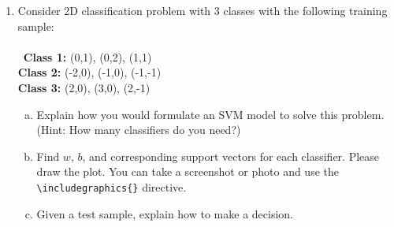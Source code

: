 \documentclass[11pt]{article}
\begin{document}
\begin{enumerate}

\item Consider 2D classification problem with 3 classes with the following training sample:\\\\\
\textbf{Class 1:} (0,1), (0,2), (1,1)\\
\textbf{Class 2:} (-2,0), (-1,0), (-1,-1)\\
\textbf{Class 3:} (2,0), (3,0), (2,-1)\\
\begin{enumerate}[(a)]
    \item 
    Explain how you would formulate an SVM model to solve this problem. (Hint: How many classifiers do you need?)\\
\begin{answertext}{5cm}{}  
\end{answertext} 
    \item
    Find $w$, $b$, and corresponding support vectors for each classifier. Please draw the plot.  You can take a screenshot or photo and use the \texttt{{\textbackslash}includegraphics\{\}} directive.\\
    \item
    Given a test sample, explain how to make a decision.\\
\begin{answertext}{5cm}{}
\end{answertext} 
\end{enumerate}

\end{enumerate}
\end{document}
